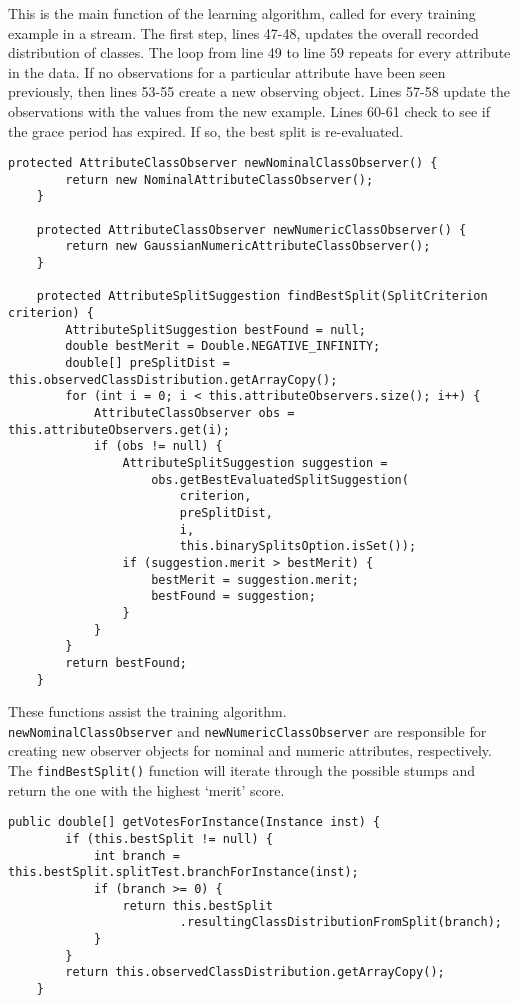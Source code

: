 \documentclass[a4paper,12pt,twoside]{book}
\begin{document}
This is the main function of the learning algorithm, called for every training example in a stream. The first step, lines 47-48, updates the overall recorded distribution of classes. The loop from line 49 to line 59 repeats for every attribute in the data. If no observations for a particular attribute have been seen previously, then lines 53-55 create a new observing object. Lines 57-58 update the observations with the values from the new example. Lines 60-61 check to see if the grace period has expired. If so, the best split is re-evaluated.

\begin{lstlisting}[caption={Functions used during training},label=lst:trainfuncs,firstnumber=79]
	protected AttributeClassObserver newNominalClassObserver() {
		return new NominalAttributeClassObserver();
	}

	protected AttributeClassObserver newNumericClassObserver() {
		return new GaussianNumericAttributeClassObserver();
	}

	protected AttributeSplitSuggestion findBestSplit(SplitCriterion criterion) {
		AttributeSplitSuggestion bestFound = null;
		double bestMerit = Double.NEGATIVE_INFINITY;
		double[] preSplitDist = this.observedClassDistribution.getArrayCopy();
		for (int i = 0; i < this.attributeObservers.size(); i++) {
			AttributeClassObserver obs = this.attributeObservers.get(i);
			if (obs != null) {
				AttributeSplitSuggestion suggestion =
					obs.getBestEvaluatedSplitSuggestion(
						criterion,
						preSplitDist,
						i,
						this.binarySplitsOption.isSet());
				if (suggestion.merit > bestMerit) {
					bestMerit = suggestion.merit;
					bestFound = suggestion;
				}
			}
		}
		return bestFound;
	}
\end{lstlisting}

These functions assist the training algorithm. \\ \verb+newNominalClassObserver+ and \verb+newNumericClassObserver+ are responsible for creating new observer objects for nominal and numeric attributes, respectively. The \verb+findBestSplit()+ function will iterate through the possible stumps and return the one with the highest `merit' score.

\begin{lstlisting}[caption={Predicting class of unknown examples},label=lst:test,firstnumber=68]
	public double[] getVotesForInstance(Instance inst) {
		if (this.bestSplit != null) {
			int branch = this.bestSplit.splitTest.branchForInstance(inst);
			if (branch >= 0) {
				return this.bestSplit
						.resultingClassDistributionFromSplit(branch);
			}
		}
		return this.observedClassDistribution.getArrayCopy();
	}
\end{lstlisting}
\end{document}
